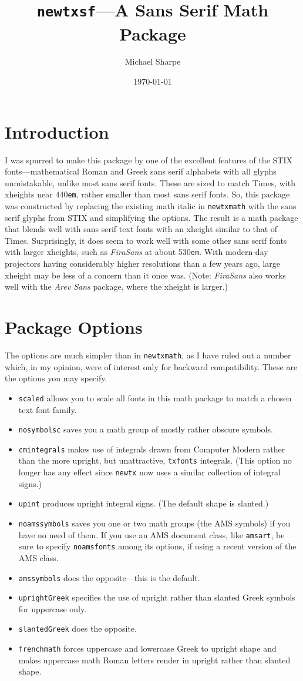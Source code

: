 \documentclass[11pt]{article}
\title{\protect\texttt{newtxsf}---A Sans Serif Math Package}
\author{Michael Sharpe}
\date{\today}  %
\begin{document}
\maketitle
\section{Introduction}
I was spurred to make this package by one of the excellent features of the STIX fonts---mathematical Roman and Greek sans serif alphabets with all glyphs unmistakable, unlike most sans serif fonts. These are sized to match Times, with xheights near 440{\tt em}, rather smaller than most sans serif fonts. So, this package was constructed by replacing the existing math italic in {\tt newtxmath} with the sans serif glyphs from STIX and simplifying the options.  The result is a math package that blends well with sans serif text fonts with an xheight similar to that of  Times. Surprisingly, it does seem to work well with some other sans serif fonts with larger xheights, such as \emph{FiraSans} at about 530{\tt em}. With modern-day projectors having considerably higher resolutions than a few years ago, large xheight may be less of a concern than it once was. (Note: \emph{FiraSans} also works well with the \emph{Arev Sans} package, where the xheight is larger.)

\section{Package Options}
The options are much simpler than in {\tt newtxmath}, as I have ruled out a number which, in my opinion, were of interest only for backward compatibility. These are the options you may specify.
\begin{itemize}
\item
{\tt scaled} allows you to scale all fonts in this math package to match a chosen text font family.
\item {\tt nosymbolsc} saves you a math group of mostly rather obscure symbols.
\item {\tt cmintegrals} makes use of integrals drawn from Computer Modern rather than the more upright, but unattractive, {\tt txfonts} integrals. (This option no longer has any effect since {\tt newtx} now uses a similar collection of integral signs.)
\item {\tt upint} produces upright integral signs. (The default shape is slanted.)
\item {\tt noamssymbols} saves you one or two math groups (the AMS symbols) if you have no need of them. If you use an AMS document class, like {\tt amsart}, be sure to specify {\tt noamsfonts} among its options, if using a recent version of the AMS class. 
\item {\tt amssymbols} does the opposite---this is the default.
\item {\tt uprightGreek} specifies the use of upright rather than slanted Greek symbols for uppercase only.
\item {\tt slantedGreek} does the opposite.
\item {\tt frenchmath} forces uppercase and lowercase Greek to upright shape and makes uppercase math Roman letters render in upright rather than slanted shape.
\end{itemize}
\end{document}
